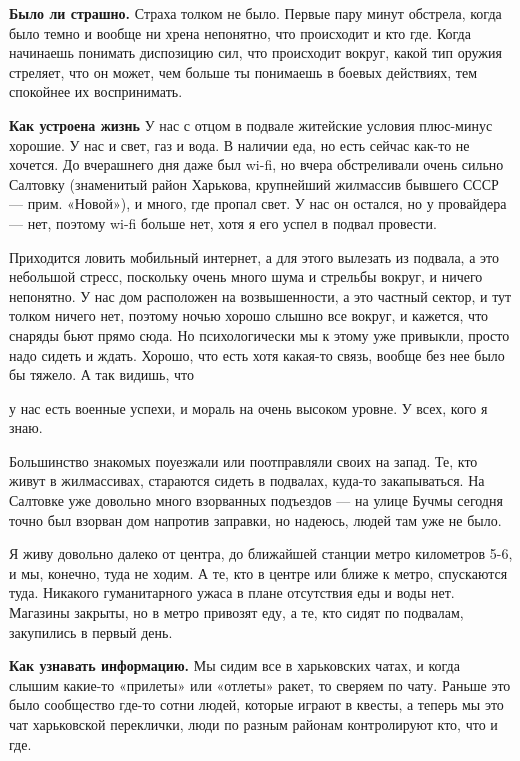 \textbf{Было ли страшно.}
Страха толком не было. Первые пару минут обстрела, когда было темно и вообще ни хрена непонятно, что происходит и кто где. Когда начинаешь понимать диспозицию сил, что происходит вокруг, какой тип оружия стреляет, что он может, чем больше ты понимаешь в боевых действиях, тем спокойнее их воспринимать.

\textbf{Как устроена жизнь}
У нас с отцом в подвале житейские условия плюс-минус хорошие. У нас и свет, газ и вода. В наличии еда, но есть сейчас как-то не хочется. До вчерашнего дня даже был wi-fi, но вчера обстреливали очень сильно Салтовку (знаменитый район Харькова, крупнейший жилмассив бывшего СССР --- прим. «Новой»), и много, где пропал свет. У нас он остался, но у провайдера --- нет, поэтому wi-fi больше нет, хотя я его успел в подвал провести.

Приходится ловить мобильный интернет, а для этого вылезать из подвала, а это небольшой стресс, поскольку очень много шума и стрельбы вокруг, и ничего непонятно. У нас дом расположен на возвышенности, а это частный сектор, и тут толком ничего нет, поэтому ночью хорошо слышно все вокруг, и кажется, что снаряды бьют прямо сюда. Но психологически мы к этому уже привыкли, просто надо сидеть и ждать. Хорошо, что есть хотя какая-то связь, вообще без нее было бы тяжело. А так видишь, что

\begin{fancyquotes}
    у нас есть военные успехи, и мораль на очень высоком уровне. У всех, кого я знаю.
\end{fancyquotes}

Большинство знакомых поуезжали или поотправляли своих на запад. Те, кто живут в жилмассивах, стараются сидеть в подвалах, куда-то закапываться. На Салтовке уже довольно много взорванных подъездов --- на улице Бучмы сегодня точно был взорван дом напротив заправки, но надеюсь, людей там уже не было.

Я живу довольно далеко от центра, до ближайшей станции метро километров 5-6, и мы, конечно, туда не ходим. А те, кто в центре или ближе к метро, спускаются туда. Никакого гуманитарного ужаса в плане отсутствия еды и воды нет. Магазины закрыты, но в метро привозят еду, а те, кто сидят по подвалам, закупились в первый день.

\textbf{Как узнавать информацию.}
Мы сидим все в харьковских чатах, и когда слышим какие-то «прилеты» или «отлеты» ракет, то сверяем по чату. Раньше это было сообщество где-то сотни людей, которые играют в квесты, а теперь мы это чат харьковской переклички, люди по разным районам контролируют кто, что и где.

